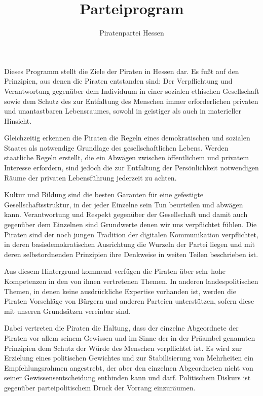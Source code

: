 \documentclass[10pt,a4paper,twocolumn,twoside,titlepage]{article}
\author{Piratenpartei Hessen}
\title{Parteiprogram}
\begin{document}
\maketitle

\begin{firstpage}
Dieses Programm stellt die Ziele der Piraten in Hessen dar. Es fußt auf den Prinzipien, aus denen die Piraten entstanden sind: Der Verpflichtung und Verantwortung gegenüber dem Individuum in einer sozialen ethischen Gesellschaft sowie dem Schutz des zur Entfaltung des Menschen immer erforderlichen privaten und unantastbaren Lebensraumes, sowohl in geistiger als auch in materieller Hinsicht.

Gleichzeitig erkennen die Piraten die Regeln eines demokratischen und sozialen Staates als notwendige Grundlage des gesellschaftlichen Lebens. Werden staatliche Regeln erstellt, die ein Abwägen zwischen öffentlichem und privatem Interesse erfordern, sind jedoch die zur Entfaltung der Persönlichkeit notwendigen Räume der privaten Lebensführung jederzeit zu achten.

Kultur und Bildung sind die besten Garanten für eine gefestigte Gesellschaftsstruktur, in der jeder Einzelne sein Tun beurteilen und abwägen kann. Verantwortung und Respekt gegenüber der Gesellschaft und damit auch gegenüber dem Einzelnen sind Grundwerte denen wir uns verpflichtet fühlen.
Die Piraten sind der noch jungen Tradition der digitalen Kommunikation verpflichtet, in deren basisdemokratischen Ausrichtung die Wurzeln der Partei liegen und mit deren selbstordnenden Prinzipien ihre Denkweise in weiten Teilen beschrieben ist.

Aus diesem Hintergrund kommend verfügen die Piraten über sehr hohe Kompetenzen in den von ihnen vertretenen Themen. In anderen landespolitischen Themen, in denen keine ausdrückliche Expertise vorhanden ist, werden die Piraten Vorschläge von Bürgern und anderen Parteien unterstützen, sofern diese mit unseren Grundsätzen vereinbar sind.

Dabei vertreten die Piraten die Haltung, dass der einzelne Abgeordnete der Piraten vor allem seinem Gewissen und im Sinne der in der Präambel genannten Prinzipien dem Schutz der Würde des Menschen verpflichtet ist. Es wird zur Erzielung eines politischen Gewichtes und zur Stabilisierung von Mehrheiten ein Empfehlungsrahmen angestrebt, der aber den einzelnen Abgeordneten nicht von seiner Gewissensentscheidung entbinden kann und darf. Politischem Diskurs ist gegenüber parteipolitischem Druck der Vorrang einzuräumen.
\end{firstpage}
\end{document}
